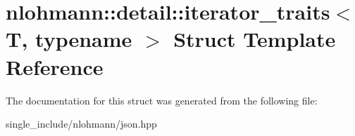 \hypertarget{structnlohmann_1_1detail_1_1iterator__traits}{}\section{nlohmann\+:\+:detail\+:\+:iterator\+\_\+traits$<$ T, typename $>$ Struct Template Reference}
\label{structnlohmann_1_1detail_1_1iterator__traits}


The documentation for this struct was generated from the following file\+:\begin{DoxyCompactItemize}
\item 
single\+\_\+include/nlohmann/json.\+hpp\end{DoxyCompactItemize}
